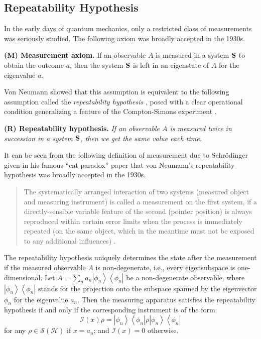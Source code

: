 \documentclass[graybox]{svmult}
\newcommand{\beq}{\begin{equation}}
\newcommand{\eeq}{\end{equation}}
\newcommand{\bS}{{\bf S}}
\newcommand{\cH}{{\mathcal H}}
\newcommand{\cI}{{\mathcal I}}
\newcommand{\cS}{{\mathcal S}}
\newcommand{\ph}{\phi}
\newcommand{\rh}{\rho}
\newcommand{\bra}[1]{\left\langle#1\right|}
\newcommand{\ket}[1]{\left|#1\right\rangle}
\newcommand{\ketbra}[1]{\ket{#1}\!\!\bra{#1}}
\begin{document}
\subsection{Repeatability Hypothesis}

In the early days of quantum mechanics,
only a restricted class of measurements was seriously studied.
The following axiom was broadly accepted in the 1930s.
\bigskip

{\bf (M) Measurement axiom.}
If an observable $A$ is measured in a system $\bS$ to obtain the outcome $a$, 
then the system $\bS$ is left in an eigenstate of $A$ for the eigenvalue $a$.
\bigskip

Von Neumann \cite{vN32E} showed that this assumption is equivalent to the following
assumption called the {\em repeatability hypothesis} \cite[p.~335]{vN32E}, 
posed with a clear operational condition generalizing a feature of the Compton-Simons 
experiment \cite[pp.~212--214]{vN32E}. 
\bigskip

{\bf (R) Repeatability hypothesis.}
{\em If an observable $A$ is measured twice in succession 
in a system $\bS$, then we get the same value each time.}
\bigskip

It can be seen from the following definition of measurement due to Schr\"{o}dinger
given in his famous ``cat paradox'' paper \cite{Sch35} that 
von Neumann's repeatability hypothesis was broadly accepted in the 1930s.


\begin{quote}
The systematically arranged interaction of two systems (measured object and 
measuring instrument) is called a measurement on the first system, if a directly-sensible variable
feature of the second (pointer position) is always reproduced within certain error limits when the
process is immediately repeated (on the same object, which in the meantime must not be exposed 
to any additional influences) \cite{Sch35}.
\end{quote}

The repeatability hypothesis uniquely determines the state 
after the measurement if the measured observable $A$ is non-degenerate, i.e., 
every eigensubspace is one-dimensional.
Let $A=\sum_{n}a_n\ketbra{\ph_n}$ be a non-degenerate observable,
where $\ketbra{\ph_n}$ stands for the projection onto the subspace spanned by
the eigenvector $\ph_n$ for the eigenvalue $a_n$.
Then the measuring apparatus satisfies the repeatability hypothesis
if and only if the corresponding instrument is of the form:
\beq
\cI(x)\rh=\ketbra{\ph_n}\rh\ketbra{\ph_n}
\eeq
for any $\rh\in\cS(\cH)$ if $x=a_n$; and $\cI(x)=0$ otherwise.
\end{document}
